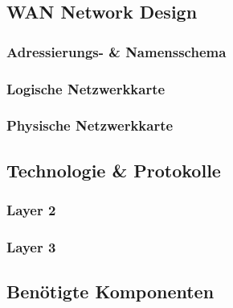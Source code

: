 \subsection{WAN Network Design}

\subsubsection{Adressierungs- \& Namensschema}

\subsubsection{Logische Netzwerkkarte}
\subsubsection{Physische Netzwerkkarte}

\subsection{Technologie \& Protokolle}
\subsubsection{Layer 2}
\subsubsection{Layer 3}

\subsection{Benötigte Komponenten}


